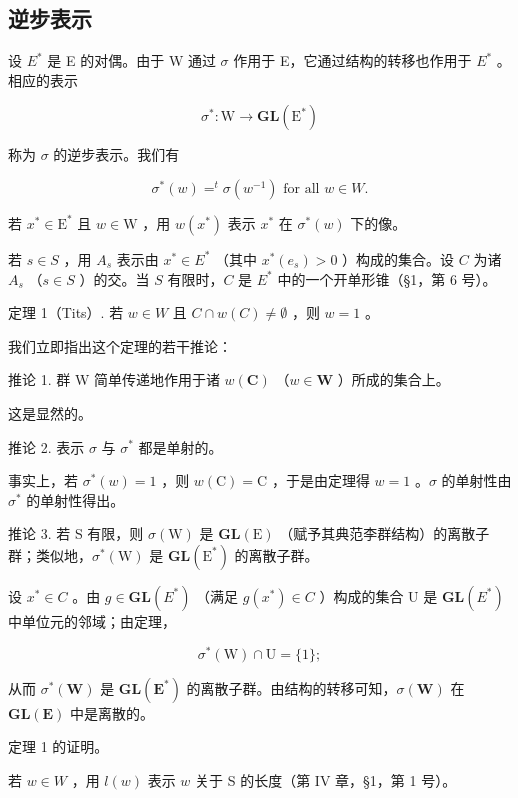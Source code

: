\subsection{逆步表示}

设 \(E^{*}\) 是 E 的对偶。由于 W 通过 \(\sigma\) 作用于 E，它通过结构的转移也作用于 \(E^{*}\) 。相应的表示

\[
\sigma^ {*}: \mathrm{W} \to \mathbf {G L} (\mathrm{E} ^ {*})
\]

称为 \(\sigma\) 的逆步表示。我们有

\[
\sigma^ {*} (w) = ^ {t} \sigma \left(w ^ {- 1}\right) \text {   for   all   } w \in W.
\]

若 \(x^{*} \in \mathrm{E}^{*}\) 且 \(w \in \mathrm{W}\) ，用 \(w(x^{*})\) 表示 \(x^{*}\) 在 \(\sigma^{*}(w)\) 下的像。

若 \(s \in S\) ，用 \(A_s\) 表示由 \(x^* \in E^*\) （其中 \(x^*(e_s) > 0\) ）构成的集合。设 \(C\) 为诸 \(A_s\) （\(s \in S\) ）的交。当 \(S\) 有限时，\(C\) 是 \(E^*\) 中的一个开单形锥（§1，第 6 号）。

定理 1（Tits）. 若 \(w \in W\) 且 \(C \cap w(C) \neq \emptyset\) ，则 \(w = 1\) 。

我们立即指出这个定理的若干推论：

推论 1. 群 W 简单传递地作用于诸 \(w(\mathbf{C})\) （\(w \in \mathbf{W}\) ）所成的集合上。

这是显然的。

推论 2. 表示 \(\sigma\) 与 \(\sigma^{*}\) 都是单射的。

事实上，若 \(\sigma^{*}(w) = 1\) ，则 \(w(\mathrm{C}) = \mathrm{C}\) ，于是由定理得 \(w = 1\) 。\(\sigma\) 的单射性由 \(\sigma^{*}\) 的单射性得出。

推论 3. 若 S 有限，则 \(\sigma(\mathrm{W})\) 是 \(\mathbf{GL}(\mathrm{E})\) （赋予其典范李群结构）的离散子群；类似地，\(\sigma^{*}(\mathrm{W})\) 是 \(\mathbf{GL}(\mathrm{E}^{*})\) 的离散子群。

设 \(x^{*} \in C\) 。由 \(g \in \mathbf{GL}(E^{*})\) （满足 \(g(x^{*}) \in C\) ）构成的集合 U 是 \(\mathbf{GL}(E^{*})\) 中单位元的邻域；由定理，

\[
\sigma^ {*} (\mathrm{W}) \cap \mathrm{U} = \{1 \};
\]

从而 \(\sigma^{*}(\mathbf{W})\) 是 \(\mathbf{GL}(\mathbf{E}^{*})\) 的离散子群。由结构的转移可知，\(\sigma(\mathbf{W})\) 在 \(\mathbf{GL}(\mathbf{E})\) 中是离散的。

定理 1 的证明。

若 \(w \in W\) ，用 \(l(w)\) 表示 \(w\) 关于 S 的长度（第 IV 章，§1，第 1 号）。

